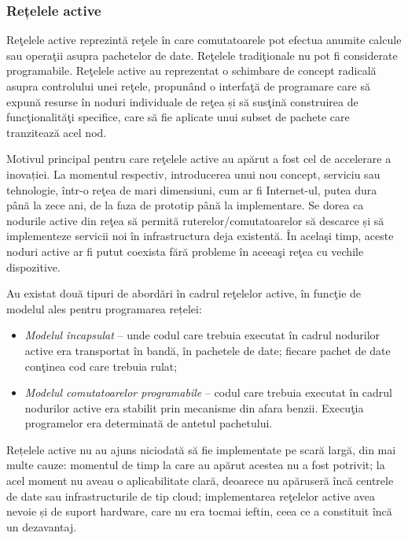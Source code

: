 \subsubsection{Rețelele active}

Reţelele active reprezintă reţele în care comutatoarele pot efectua anumite calcule sau operaţii asupra pachetelor de date. Reţelele tradiţionale nu pot fi considerate programabile. Reţelele active au reprezentat o schimbare de concept radicală asupra controlului unei reţele, propunând o interfaţă de programare care să expună resurse în noduri individuale de reţea și să susţină construirea de funcţionalităţi specifice, care să fie aplicate unui subset de pachete care tranzitează acel nod.

Motivul principal pentru care reţelele active au apărut a fost cel de accelerare a inovației. La momentul respectiv, introducerea unui nou concept, serviciu sau tehnologie, într-o reţea de mari dimensiuni, cum ar fi Internet-ul, putea dura până la zece ani, de la faza de prototip până la implementare. Se dorea ca nodurile active din reţea să permită ruterelor/comutatoarelor să descarce și să implementeze servicii noi în infrastructura deja existentă. În acelaşi timp, aceste noduri active ar fi putut coexista fără probleme în aceeaşi reţea cu vechile dispozitive.

Au existat două tipuri de abordări în cadrul reţelelor active, în funcţie de modelul ales pentru programarea rețelei:
\begin{itemize}
\item \textit{Modelul încapsulat} – unde codul care trebuia executat în cadrul nodurilor active era transportat în bandă, în pachetele de date; fiecare pachet de date conţinea cod care trebuia rulat;
\item \textit{Modelul comutatoarelor programabile} – codul care trebuia executat în cadrul nodurilor active era stabilit prin mecanisme din afara benzii. Execuţia programelor era determinată de antetul pachetului.
\end{itemize}

Rețelele active nu au ajuns niciodată să fie implementate pe scară largă, din mai multe cauze: momentul de timp la care au apărut acestea nu a fost potrivit; la acel moment nu aveau o aplicabilitate clară, deoarece nu apăruseră încă centrele de date sau infrastructurile de tip cloud; implementarea reţelelor active avea nevoie și de suport hardware, care nu era tocmai ieftin, ceea ce a constituit încă un dezavantaj.

